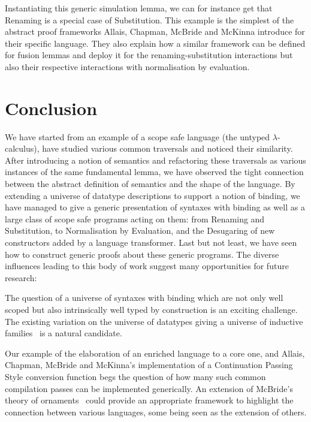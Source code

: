 Instantiating this generic simulation lemma, we can for instance get
that Renaming is a special case of Substitution. This example is the
simplest of the abstract proof frameworks Allais, Chapman, McBride
and McKinna introduce for their specific language. They also explain
how a similar framework can be defined for fusion lemmas and deploy
it for the renaming-substitution interactions but also their respective
interactions with normalisation by evaluation.

\section{Conclusion}

We have started from an example of a scope safe language (the
untyped $\lambda$-calculus), have studied various common traversals
and noticed their similarity. After introducing a notion of semantics
and refactoring these traversals as various instances of the same
fundamental lemma, we have observed the tight connection between the
abstract definition of semantics and the shape of the language. By
extending a universe of datatype descriptions to support a notion of
binding, we have managed to give a generic presentation of syntaxes
with binding as well as a large class of scope safe programs acting
on them: from Renaming and Substitution, to Normalisation by Evaluation,
and the Desugaring of new constructors added by a language transformer.
Last but not least, we have seen how to construct generic proofs about
these generic programs. The diverse influences leading to this body of
work suggest many opportunities for future research:

The question of a universe of syntaxes with binding which are not only
well scoped but also intrinsically well typed by construction is an
exciting challenge. The existing variation on the universe of datatypes
giving a universe of inductive families~\cite{dybjer1994inductive}
is a natural candidate.

Our example of the elaboration of an enriched language to a core one,
and Allais, Chapman, McBride and McKinna's implementation of a
Continuation Passing Style conversion function begs the question of how
many such common compilation passes can be implemented generically.
An extension of McBride's theory of ornaments~\citeyear{mcbride2010ornamental}
could provide an appropriate framework to highlight the connection
between various languages, some being seen as the extension of others.
